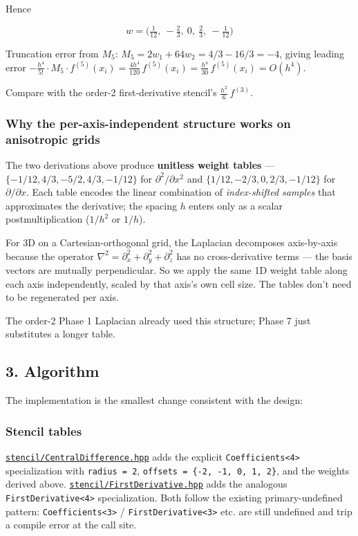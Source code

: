 Hence

\[
\boxed{\;w = \bigl(\tfrac{1}{12},\ -\tfrac{2}{3},\ 0,\ \tfrac{2}{3},\ -\tfrac{1}{12}\bigr)\;}
\]

Truncation error from \(M_5\):
\(M_5 = 2 w_1 + 64 w_2 = 4/3 - 16/3 = -4\), giving leading error
\(-\tfrac{h^4}{5!}\cdot M_5 \cdot f^{(5)}(x_i) = \tfrac{4 h^4}{120}\,f^{(5)}(x_i) = \tfrac{h^4}{30}\,f^{(5)}(x_i) = O(h^4)\).

Compare with the order-2 first-derivative stencil's
\(\tfrac{h^2}{6}\,f^{(3)}\).

\subsubsection{Why the per-axis-independent structure works on
anisotropic
grids}\label{why-the-per-axis-independent-structure-works-on-anisotropic-grids}

The two derivations above produce \textbf{unitless weight tables} ---
\(\{-1/12, 4/3, -5/2, 4/3, -1/12\}\) for \(\partial^2/\partial x^2\) and
\(\{1/12, -2/3, 0, 2/3, -1/12\}\) for \(\partial/\partial x\). Each
table encodes the linear combination of \emph{index-shifted samples}
that approximates the derivative; the spacing \(h\) enters only as a
scalar postmultiplication (\(1/h^2\) or \(1/h\)).

For 3D on a Cartesian-orthogonal grid, the Laplacian decomposes
axis-by-axis because the operator
\(\nabla^2 = \partial_x^2 + \partial_y^2 + \partial_z^2\) has no
cross-derivative terms --- the basis vectors are mutually perpendicular.
So we apply the same 1D weight table along each axis independently,
scaled by that axis's own cell size. The tables don't need to be
regenerated per axis.

The order-2 Phase 1 Laplacian already used this structure; Phase 7 just
substitutes a longer table.

\subsection{3. Algorithm}\label{algorithm}

The implementation is the smallest change consistent with the design:

\subsubsection{Stencil tables}\label{stencil-tables}

\href{../../../include/gridcalc/stencil/CentralDifference.hpp}{\passthrough{\lstinline!stencil/CentralDifference.hpp!}}
adds the explicit \passthrough{\lstinline!Coefficients<4>!}
specialization with \passthrough{\lstinline!radius = 2!},
\passthrough{\lstinline!offsets = \{-2, -1, 0, 1, 2\}!}, and the weights
derived above.
\href{../../../include/gridcalc/stencil/FirstDerivative.hpp}{\passthrough{\lstinline!stencil/FirstDerivative.hpp!}}
adds the analogous \passthrough{\lstinline!FirstDerivative<4>!}
specialization. Both follow the existing primary-undefined pattern:
\passthrough{\lstinline!Coefficients<3>!} /
\passthrough{\lstinline!FirstDerivative<3>!} etc. are still undefined
and trip a compile error at the call site.

